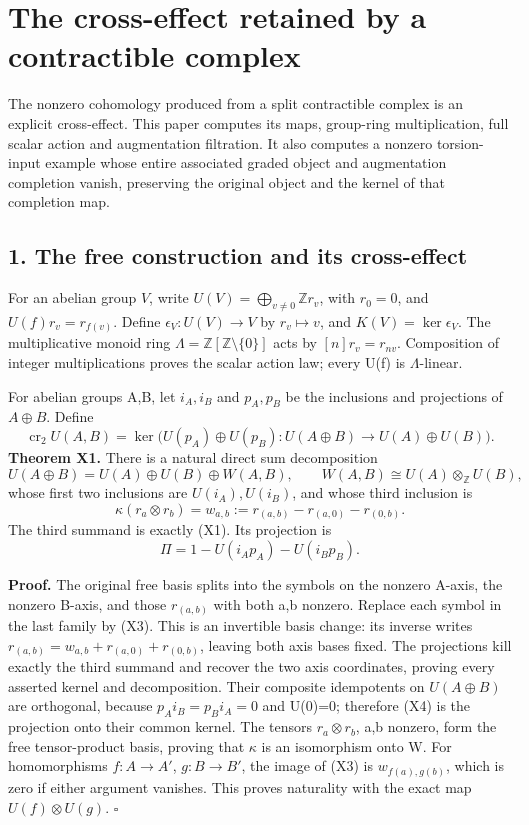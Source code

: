 \documentclass[
]{article}
\author{}
\date{}
\begin{document}
{
\setcounter{tocdepth}{3}
\tableofcontents
}
\section{The cross-effect retained by a contractible
complex}\label{the-cross-effect-retained-by-a-contractible-complex}

The nonzero cohomology produced from a split contractible complex is an
explicit cross-effect. This paper computes its maps, group-ring
multiplication, full scalar action and augmentation filtration. It also
computes a nonzero torsion-input example whose entire associated graded
object and augmentation completion vanish, preserving the original
object and the kernel of that completion map.

\subsection{1. The free construction and its
cross-effect}\label{the-free-construction-and-its-cross-effect}

For an abelian group \(V\), write
\(U(V)=\bigoplus_{v\ne0}\mathbb Zr_v\), with \(r_0=0\), and
\(U(f)r_v=r_{f(v)}\). Define \(\epsilon_V:U(V)\to V\) by
\(r_v\mapsto v\), and \(K(V)=\ker\epsilon_V\). The multiplicative monoid
ring \(\Lambda=\mathbb Z[\mathbb Z\setminus\{0\}]\) acts by
\([n]r_v=r_{nv}\). Composition of integer multiplications proves the
scalar action law; every U(f) is \(\Lambda\)-linear.

For abelian groups A,B, let \(i_A,i_B\) and \(p_A,p_B\) be the
inclusions and projections of \(A\oplus B\). Define \[
\operatorname{cr}_2U(A,B)=
\ker\bigl(U(p_A)\oplus U(p_B):U(A\oplus B)\to U(A)\oplus U(B)\bigr).
\tag{X1}
\] \textbf{Theorem X1.} There is a natural direct sum decomposition \[
U(A\oplus B)=U(A)\oplus U(B)\oplus W(A,B),
\qquad W(A,B)\cong U(A)\otimes_{\mathbb Z}U(B),
\tag{X2}
\] whose first two inclusions are \(U(i_A),U(i_B)\), and whose third
inclusion is \[
\kappa(r_a\otimes r_b)
=w_{a,b}:=r_{(a,b)}-r_{(a,0)}-r_{(0,b)}.
\tag{X3}
\] The third summand is exactly (X1). Its projection is \[
\Pi=1-U(i_Ap_A)-U(i_Bp_B).
\tag{X4}
\]

\textbf{Proof.} The original free basis splits into the symbols on the
nonzero A-axis, the nonzero B-axis, and those \(r_{(a,b)}\) with both
a,b nonzero. Replace each symbol in the last family by (X3). This is an
invertible basis change: its inverse writes
\(r_{(a,b)}=w_{a,b}+r_{(a,0)}+r_{(0,b)}\), leaving both axis bases
fixed. The projections kill exactly the third summand and recover the
two axis coordinates, proving every asserted kernel and decomposition.
Their composite idempotents on \(U(A\oplus B)\) are orthogonal, because
\(p_Ai_B=p_Bi_A=0\) and U(0)=0; therefore (X4) is the projection onto
their common kernel. The tensors \(r_a\otimes r_b\), a,b nonzero, form
the free tensor-product basis, proving that \(\kappa\) is an isomorphism
onto W. For homomorphisms \(f:A\to A'\), \(g:B\to B'\), the image of
(X3) is \(w_{f(a),g(b)}\), which is zero if either argument vanishes.
This proves naturality with the exact map \(U(f)\otimes U(g)\).
\(\square\)
\end{document}
